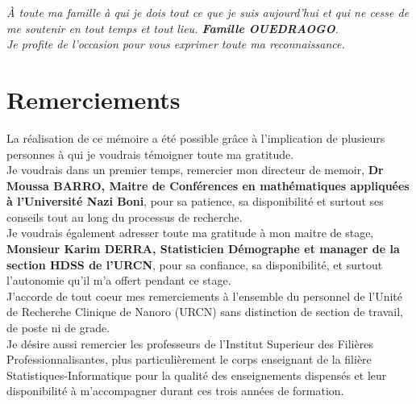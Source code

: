 \documentclass[12pt,a4paper]{report}
\begin{document}
	\vspace*{5cm}  %

	\begin{center}
			\textit{À toute ma famille à qui je dois tout ce que je suis aujourd'hui et qui ne cesse de me soutenir en tout temps et tout lieu. \textbf{Famille OUEDRAOGO}.\\
			Je profite de l’occasion pour vous exprimer toute ma reconnaissance.}
	\end{center}	
		
		
	
	\vspace{1.5cm}
	
	\newpage
	
	\chapter*{Remerciements}       %
	
	\vspace*{2cm}
	
	
	La réalisation de ce mémoire a été possible grâce à l'implication de plusieurs personnes à qui
	je voudrais témoigner toute ma gratitude.\\
	
	
	Je voudrais dans un premier temps, remercier mon directeur de memoir, \textbf{Dr Moussa BARRO, Maitre de Conférences en mathématiques appliquées
	à l’Université Nazi Boni}, pour sa patience, sa disponibilité et surtout ses conseils  tout au long du processus de recherche.\\
	
	
	Je voudrais également adresser toute ma gratitude à mon maitre de stage, \textbf{Monsieur Karim DERRA, Statisticien Démographe et manager de la section HDSS de l'URCN}, pour sa confiance, sa disponibilité, et surtout l’autonomie qu’il m’a offert pendant ce stage.\\
	
	
	J'accorde de tout  coeur mes remerciements à l'ensemble du personnel de  l'Unité de Recherche Clinique de Nanoro (URCN) sans distinction de section de travail, de poste ni de grade. \\
	
	
	Je désire aussi remercier les professeurs de l'Institut Superieur des Filières Professionnalisantes, plus particulièrement le corps enseignant de la filière Statistiques-Informatique pour la qualité des enseignements dispensés et leur disponibilité à m'accompagner durant ces trois années de formation.
	
\end{document}
